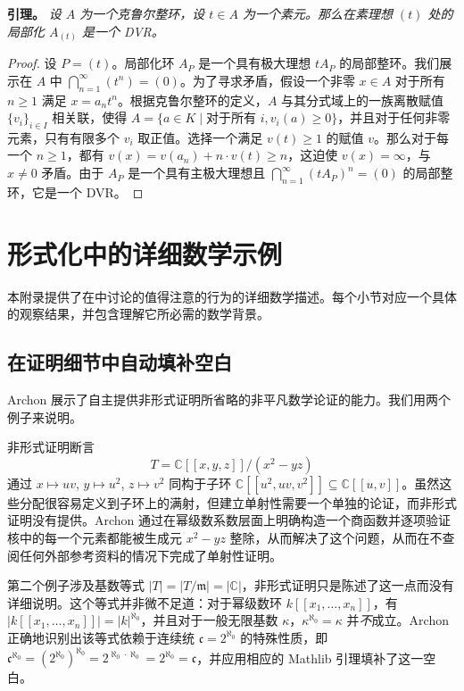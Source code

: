 \noindent\textbf{引理。} \textit{设 $A$ 为一个克鲁尔整环，设 $t \in A$ 为一个素元。那么在素理想 $(t)$ 处的局部化 $A_{(t)}$ 是一个 DVR。}

\begin{proof}
设 $P = (t)$。局部化环 $A_P$ 是一个具有极大理想 $tA_P$ 的局部整环。我们展示在 $A$ 中 $\bigcap_{n=1}^{\infty} (t^n) = (0)$。为了寻求矛盾，假设一个非零 $x \in A$ 对于所有 $n \geq 1$ 满足 $x = a_n t^n$。根据克鲁尔整环的定义，$A$ 与其分式域上的一族离散赋值 $\{v_i\}_{i \in I}$ 相关联，使得 $A = \{a \in K \mid \text{对于所有 } i, v_i(a) \geq 0\}$，并且对于任何非零元素，只有有限多个 $v_i$ 取正值。选择一个满足 $v(t) \geq 1$ 的赋值 $v$。那么对于每一个 $n \geq 1$，都有 $v(x) = v(a_n) + n \cdot v(t) \geq n$，这迫使 $v(x) = \infty$，与 $x \neq 0$ 矛盾。由于 $A_P$ 是一个具有主极大理想且 $\bigcap_{n=1}^{\infty} (tA_P)^n = (0)$ 的局部整环，它是一个 DVR。
\end{proof}


\section{形式化中的详细数学示例}\label{appendix:detailed-examples}

本附录提供了在中讨论的值得注意的行为的详细数学描述。每个小节对应一个具体的观察结果，并包含理解它所必需的数学背景。

\subsection{在证明细节中自动填补空白}\label{subsubsec:gap-filling}

Archon 展示了自主提供非形式证明所省略的非平凡数学论证的能力。我们用两个例子来说明。

非形式证明断言
\[
T = \mathbb{C}[[x,y,z]]/(x^2 - yz)
\]
通过 $x \mapsto uv$, $y \mapsto u^2$, $z \mapsto v^2$ 同构于子环 $\mathbb{C}[[u^2, uv, v^2]] \subseteq \mathbb{C}[[u,v]]$。虽然这些分配很容易定义到子环上的满射，但建立单射性需要一个单独的论证，而非形式证明没有提供。Archon 通过在幂级数系数层面上明确构造一个商函数并逐项验证核中的每一个元素都能被生成元 $x^2 - yz$ 整除，从而解决了这个问题，从而在不查阅任何外部参考资料的情况下完成了单射性证明。

第二个例子涉及基数等式 $|T| = |T/\mathfrak{m}| = |\mathbb{C}|$，非形式证明只是陈述了这一点而没有详细说明。这个等式并非微不足道：对于幂级数环 $k[[x_1, \ldots, x_n]]$，有 $|k[[x_1, \ldots, x_n]]| = |k|^{\aleph_0}$，并且对于一般无限基数 $\kappa$，$\kappa^{\aleph_0} = \kappa$ 并\emph{不}成立。Archon 正确地识别出该等式依赖于连续统 $\mathfrak{c} = 2^{\aleph_0}$ 的特殊性质，即 $\mathfrak{c}^{\aleph_0} = (2^{\aleph_0})^{\aleph_0} = 2^{\aleph_0 \cdot \aleph_0} = 2^{\aleph_0} = \mathfrak{c}$，并应用相应的 Mathlib 引理填补了这一空白。

